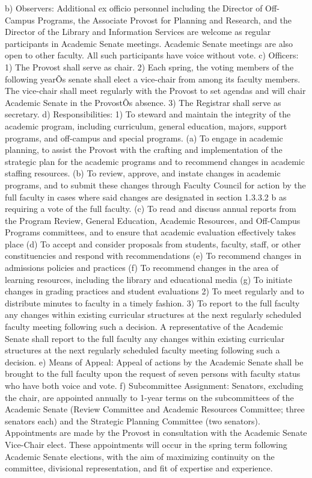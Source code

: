\documentclass[letterpaper, 11pt]{article}
\begin{document}
			b) Observers:  Additional ex officio personnel including the Director of Off-Campus Programs, the Associate Provost for Planning and Research, and the Director of the Library and Information Services are welcome as regular participants in Academic Senate meetings.  Academic Senate meetings are also open to other faculty.  All such participants have voice without vote.
			c) Officers:
			1) The Provost shall serve as chair.
			2) Each spring, the voting members of the following yearÕs senate shall elect a vice-chair from among its faculty members.  The vice-chair shall meet regularly with the Provost to set agendas and will chair Academic Senate in the ProvostÕs absence.
			3) The Registrar shall serve as secretary.
			d) Responsibilities:
			1) To steward and maintain the integrity of the academic program, including curriculum, general education, majors, support programs, and off-campus and special programs.
			(a) To engage in academic planning, to assist the Provost with the crafting and implementation of the strategic plan for the academic programs and to recommend changes in academic staffing resources.
			(b) To review, approve, and instate changes in academic programs, and to submit these changes through Faculty Council for action by the full faculty in cases where said changes are designated in section 1.3.3.2 b as requiring a vote of the full faculty.
			(c) To read and discuss annual reports from the Program Review, General Education, Academic Resources, and Off-Campus Programs committees, and to ensure that academic evaluation effectively takes place
			(d) To accept and consider proposals from students, faculty, staff, or other constituencies and respond with recommendations
			(e) To recommend changes in admissions policies and practices
			(f) To recommend changes in the area of learning resources, including the library and educational media
			(g) To initiate changes in grading practices and student evaluations
			2) To meet regularly and to distribute minutes to faculty in a timely fashion.
			3) To report to the full faculty any changes within existing curricular structures at the next regularly scheduled faculty meeting following such a decision. A representative of the Academic Senate shall report to the full faculty any changes within existing curricular structures at the next regularly scheduled faculty meeting following such a decision.
			e) Means of Appeal:  Appeal of actions by the Academic Senate shall be brought to the full faculty upon the request of seven persons with faculty status who have both voice and vote.
			f) Subcommittee Assignment:  Senators, excluding the chair, are appointed annually to 1-year terms on the subcommittees of the Academic Senate (Review Committee and Academic Resources Committee; three senators each) and the Strategic Planning Committee (two senators).  Appointments are made by the Provost in consultation with the Academic Senate Vice-Chair elect.  These appointments will occur in the spring term following Academic Senate elections, with the aim of maximizing continuity on the committee, divisional representation, and fit of expertise and experience.
\end{document}
